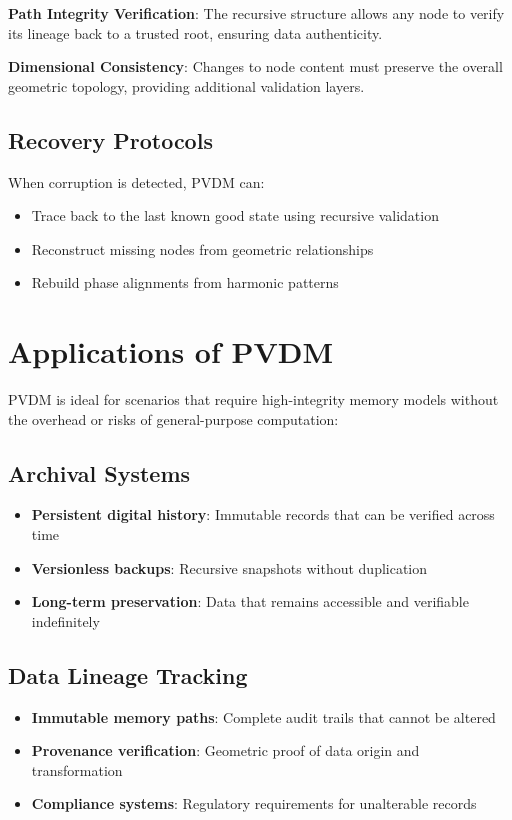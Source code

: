 \documentclass[12pt,a4paper]{article}
\begin{document}
\textbf{Path Integrity Verification}: The recursive structure allows any node to verify its lineage back to a trusted root, ensuring data authenticity.

\textbf{Dimensional Consistency}: Changes to node content must preserve the overall geometric topology, providing additional validation layers.

\subsection{Recovery Protocols}

When corruption is detected, PVDM can:
\begin{itemize}
    \item Trace back to the last known good state using recursive validation
    \item Reconstruct missing nodes from geometric relationships
    \item Rebuild phase alignments from harmonic patterns
\end{itemize}

\section{Applications of PVDM}

PVDM is ideal for scenarios that require high-integrity memory models without the overhead or risks of general-purpose computation:

\subsection{Archival Systems}
\begin{itemize}
    \item \textbf{Persistent digital history}: Immutable records that can be verified across time
    \item \textbf{Versionless backups}: Recursive snapshots without duplication
    \item \textbf{Long-term preservation}: Data that remains accessible and verifiable indefinitely
\end{itemize}

\subsection{Data Lineage Tracking}
\begin{itemize}
    \item \textbf{Immutable memory paths}: Complete audit trails that cannot be altered
    \item \textbf{Provenance verification}: Geometric proof of data origin and transformation
    \item \textbf{Compliance systems}: Regulatory requirements for unalterable records
\end{itemize}
\end{document}
